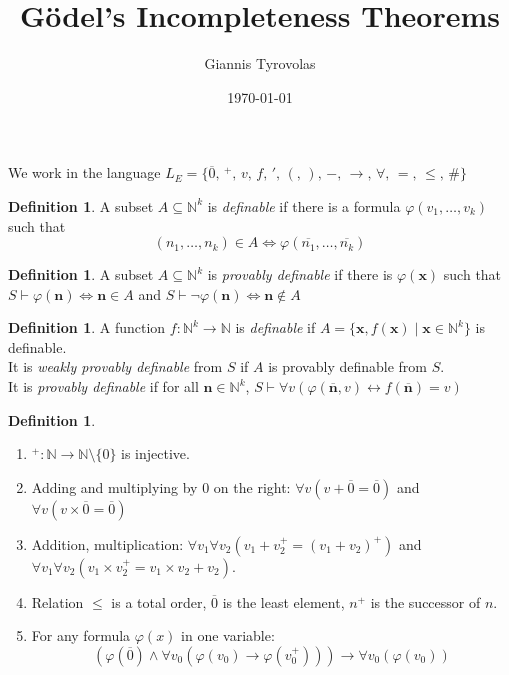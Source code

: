 \documentclass[a4paper,10pt]{article}
\title{Gödel's Incompleteness Theorems}
\author{Giannis Tyrovolas}
\date{\today}
\theoremstyle{definition}
\newtheorem{definition}[theorem]{Definition}
\let\vec\mathbf
\let\phi\varphi
\newcommand{\zero}{\overline{0}}
\begin{document}
We work in the language ${L}_E = \{\overline{0}, \,{}^+, \,v,\, f,\, ',\, (,\, ),\, -,\, \rightarrow, \,\forall, \,= ,\, \leqslant, \,\#\}$

\begin{definition}
    A subset $A \subseteq \mathbb{N}^k$ is \emph{definable} if there is a formula $\varphi(v_1, \ldots, v_k)$ such that 
    \[(n_1, \ldots, n_k) \in A \iff \varphi(\overline{n_1}, \ldots, \overline{n_k})\]
\end{definition}

\begin{definition}
    A subset $A \subseteq \mathbb{N}^k$ is \emph{provably definable} if there is $\varphi(\vec{x})$ such that $S \vdash \varphi(\vec{n}) \iff \vec{n} \in A$ and $S \vdash \neg\varphi(\vec{n}) \iff \vec{n} \notin A$ 
\end{definition}

\begin{definition}
    A function $f \colon \mathbb{N}^k \longrightarrow \mathbb{N}$ is \emph{definable} if $A = \{\vec{x}, f(\vec{x}) \mid \vec{x} \in \mathbb{N}^k\}$ is definable.\\
    It is \emph{weakly provably definable} from $S$ if $A$ is provably definable from $S$.\\
    It is \emph{provably definable} if for all $\vec{n} \in \mathbb{N}^k$, $S \vdash \forall v \left(\varphi(\overline{\vec{n}}, v) \leftrightarrow  f(\overline{\vec{n}}) = v\right)$
\end{definition}

\begin{definition}
    \begin{enumerate}
        \itemsep0em 
        \item $^{+} \colon \mathbb{N} \longrightarrow \mathbb{N} \setminus \{0\}$ is injective.
        \item Adding and multiplying by 0 on the right: $\forall v \left(v + \zero =\zero \right)$ and $\forall v \left(v \times \zero = \zero\right)$
        \item Addition, multiplication: $ \forall v_1 \forall v_2 (v_1 + v_2^+ = (v_1 + v_2)^+)$ and $\forall v_1 \forall v_2 (v_1 \times v_2^+ = v_1 \times v_2 + v_2)$.
        \item Relation $\leqslant$ is a total order, $\zero$ is the least element, $n^+$ is the successor of $n$.
        \item For any formula $\varphi(x)$ in one variable:
        \[
            (\varphi(\zero) \land \forall v_0(\varphi(v_0) \rightarrow \phi(v_0^+))) \rightarrow \forall v_0 (\phi(v_0))
        \]
    \end{enumerate}
\end{definition}
\end{document}
